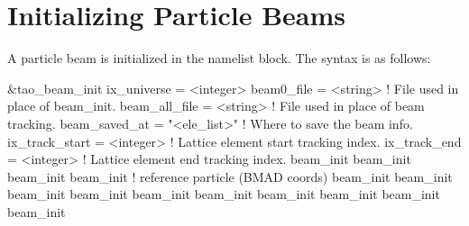 {{{{{{{{{{{{{%
\section{Initializing Particle Beams}
\label{s:beam.init}

A particle beam is initialized in the  namelist block.
The syntax is as follows:
\begin{example}
  &tao_beam_init
    ix_universe             = <integer>
    beam0_file              = <string>         ! File used in place of beam_init.
    beam_all_file           = <string>         ! File used in place of beam tracking.
    beam_saved_at           = "<ele_list>"     ! Where to save the beam info.
    ix_track_start          = <integer>        ! Lattice element start tracking index.
    ix_track_end            = <integer>        ! Lattice element end tracking index.
    beam_init%
    beam_init%
    beam_init%
    beam_init%
                                               ! reference particle (BMAD coords)
    beam_init%
    beam_init%
    beam_init%
    beam_init%
    beam_init%
    beam_init%
    beam_init%
    beam_init%
    beam_init%
    beam_init%

\end{example}}}}}}}}}}}}}}
